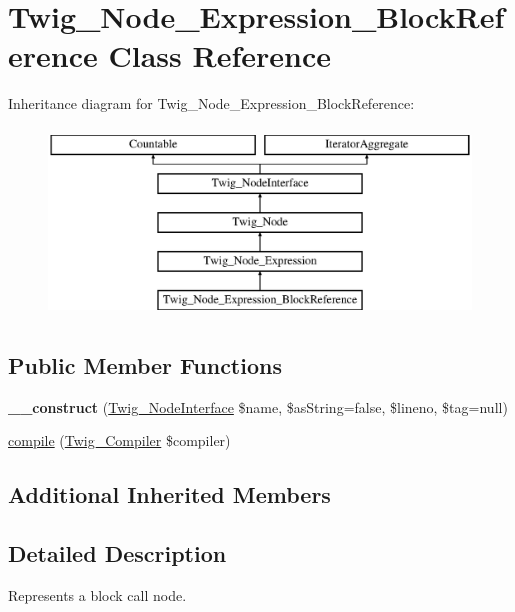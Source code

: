 \hypertarget{classTwig__Node__Expression__BlockReference}{}\section{Twig\+\_\+\+Node\+\_\+\+Expression\+\_\+\+Block\+Reference Class Reference}
\label{classTwig__Node__Expression__BlockReference}
Inheritance diagram for Twig\+\_\+\+Node\+\_\+\+Expression\+\_\+\+Block\+Reference\+:\begin{figure}[H]
\begin{center}
\leavevmode
\includegraphics[height=5.000000cm]{classTwig__Node__Expression__BlockReference}
\end{center}
\end{figure}
\subsection*{Public Member Functions}
\begin{DoxyCompactItemize}
\item 
{\bfseries \+\_\+\+\_\+construct} (\hyperlink{interfaceTwig__NodeInterface}{Twig\+\_\+\+Node\+Interface} \$name, \$as\+String=false, \$lineno, \$tag=null)\hypertarget{classTwig__Node__Expression__BlockReference_a4c1b9809a43bb48fbfd0f62352c8c59e}{}\label{classTwig__Node__Expression__BlockReference_a4c1b9809a43bb48fbfd0f62352c8c59e}

\item 
\hyperlink{classTwig__Node__Expression__BlockReference_a23537b6fa6673ea811cbbcc80babf9e1}{compile} (\hyperlink{classTwig__Compiler}{Twig\+\_\+\+Compiler} \$compiler)
\end{DoxyCompactItemize}
\subsection*{Additional Inherited Members}


\subsection{Detailed Description}
Represents a block call node.

